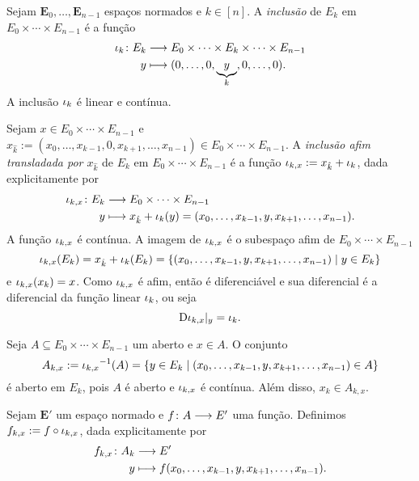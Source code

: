 Sejam $\bm E_0, \ldots, \bm E_{n-1}$ espaços normados e $k \in [n]$. A \emph{inclusão} de $E_k$ em $E_0 \times \cdots \times E_{n-1}$ é a função
	\begin{align*}
	{\iota_k}\colon {E_k} &\longrightarrow {E_0 \times \cdots \times E_k \times \cdots \times E_{n-1}} \\{y} &\longmapsto (0,\ldots,0,\underbrace{y}_k,0,\ldots,0).
	\end{align*}
A inclusão $\iota_k$ é linear e contínua.

Sejam $x \in E_0 \times \cdots \times E_{n-1}$ e $x_{\hat{k}} := (x_0,\ldots,x_{k-1},0,x_{k+1},\ldots,x_{n-1}) \in E_0 \times \cdots \times E_{n-1}$. A \emph{inclusão afim transladada por $x_{\hat{k}}$} de $E_k$ em $E_0 \times \cdots \times E_{n-1}$ é a função $\iota_{k,x} := x_{\hat{k}} + \iota_k$, dada explicitamente por
	\begin{align*}
	{\iota_{k,x}}\colon {E_k} &\longrightarrow {E_0 \times \cdots \times E_{n-1}} \\{y} &\longmapsto x_{\hat{k}}+\iota_k(y) = (x_0,\ldots,x_{k-1},y,x_{k+1},\ldots,x_{n-1}).
	\end{align*}
A função $\iota_{k,x}$ é contínua. A imagem de $\iota_{k,x}$ é o subespaço afim de $E_0 \times \cdots \times E_{n-1}$
	\begin{equation*}
	\iota_{k,x}(E_k) = x_{\hat{k}} + \iota_k(E_k) = \left\{ (x_0,\ldots,x_{k-1},y,x_{k+1},\ldots,x_{n-1}) \;\middle\vert\; y \in E_k \right\}
	\end{equation*}
e $\iota_{k,x}(x_k) = x$. Como $\iota_{k,x}$ é afim, então é diferenciável e sua diferencial é a diferencial da função linear $\iota_k$, ou seja
	\begin{equation*}
	\mathrm{D} \iota_{k,x}|_y = \iota_k.
	\end{equation*}

Seja $A \subseteq E_0 \times \cdots \times E_{n-1}$ um aberto e $x \in A$. O conjunto
	\begin{equation*}
	A_{k,x} := {\iota_{k,x}}^{-1}(A) = \left\{ y \in E_k \;\middle\vert\; (x_0,\ldots,x_{k-1},y,x_{k+1},\ldots,x_{n-1}) \in A \right\}
	\end{equation*}
é aberto em $E_k$, pois $A$ é aberto e $\iota_{k,x}$ é contínua. Além disso, $x_k \in A_{k,x}$.

Sejam $\bm E'$ um espaço normado e $f\colon \allowbreak A \longrightarrow E'$ uma função. Definimos $f_{k,x} := f \circ \iota_{k,x}$, dada explicitamente por
	\begin{align*}
	{f_{k,x}}\colon {A_k} &\longrightarrow {E'} \\{y} &\longmapsto f(x_0,\ldots,x_{k-1},y,x_{k+1},\ldots,x_{n-1}).
	\end{align*}

